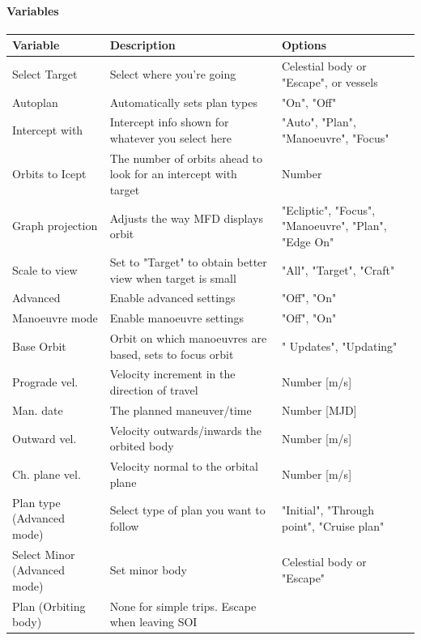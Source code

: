 \documentclass[Orbiter User Manual.tex]{subfiles}
\begin{document}
\paragraph{Variables}
	\begin{longtable}{ >{\RaggedRight}p{}
		>{\RaggedRight}p{} >{\RaggedRight}p{} }
	\hline
	\textbf{Variable} & \textbf{Description} & \textbf{Options}\\
	\hline
	Select Target & Select where you're going & Celestial body or "Escape", or
		vessels\\
	\hline
	Autoplan & Automatically sets plan types & "On", "Off"\\
	\hline
	Intercept with & Intercept info shown for whatever you select here & "Auto",
		"Plan", "Manoeuvre", "Focus"\\
	\hline
	Orbits to Icept & The number of orbits ahead to look for an intercept with
		target & Number\\
	\hline
	Graph projection & Adjusts the way MFD displays orbit & "Ecliptic", "Focus",
		"Manoeuvre", "Plan", "Edge On"\\
	\hline
	Scale to view & Set to "Target" to obtain better view when target is small &
		"All", "Target", "Craft"\\
	\hline
	Advanced & Enable advanced settings & "Off", "On"\\
	\hline
	Manoeuvre mode & Enable manoeuvre settings & "Off", "On"\\
	\hline
	Base Orbit & Orbit on which manoeuvres are based, \mfdbtn{++} sets to focus
		orbit & "\mfdbtn{++} Updates", "Updating"\\
	\hline
	Prograde vel. & Velocity increment in the direction of travel & Number
		[m/s]\\
	\hline
	Man. date & The planned maneuver/time & Number [MJD]\\
	\hline
	Outward vel. & Velocity outwards/inwards the orbited body & Number [m/s]\\
	\hline
	Ch. plane vel. & Velocity normal to the orbital plane & Number [m/s]\\
	\hline
	Plan type (Advanced mode) & Select type of plan you want to follow &
		"Initial", "Through point", "Cruise plan"\\
	\hline
	Select Minor (Advanced mode) & Set minor body & Celestial body or "Escape"\\
	\hline
	Plan (Orbiting body) & None for simple trips. Escape when leaving SOI &

\end{longtable}
\end{document}
